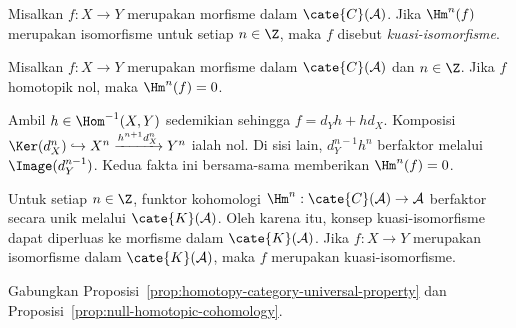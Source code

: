 \begin{definisi}\label{def:quasi-isomorphism}
	Misalkan $f:X\to Y$ merupakan morfisme dalam $\cate{C}(\mathcal{A})$.
	Jika $\Hm^n(f)$ merupakan isomorfisme untuk setiap $n\in\Z$, maka $f$
	disebut \emph{kuasi-isomorfisme}.
\end{definisi}

\begin{proposisi}\label{prop:null-homotopic-cohomology}
	Misalkan $f:X\to Y$ merupakan morfisme dalam $\cate{C}(\mathcal{A})$ dan
	$n\in\Z$. Jika $f$ homotopik nol, maka $\Hm^n(f)=0$.
\end{proposisi}

\begin{bukti}
	Ambil $h\in\Hom^{-1}(X,Y)$ sedemikian sehingga $f=d_Yh+hd_X$.
	Komposisi
	$\Ker(d_X^n)\hookrightarrow X^n\xrightarrow{h^{n+1}d_X^n}Y^n$
	ialah nol. Di sisi lain, $d_Y^{n-1}h^n$ berfaktor melalui
	$\Image(d_Y^{n-1})$. Kedua fakta ini bersama-sama memberikan
	$\Hm^n(f)=0$.
\end{bukti}

\begin{korolari}
	Untuk setiap $n\in\Z$, funktor kohomologi
	$\Hm^n:\cate{C}(\mathcal{A})\to\mathcal{A}$ berfaktor secara unik melalui
	$\cate{K}(\mathcal{A})$. Oleh karena itu, konsep kuasi-isomorfisme dapat
	diperluas ke morfisme dalam $\cate{K}(\mathcal{A})$. Jika $f:X\to Y$
	merupakan isomorfisme dalam $\cate{K}(\mathcal{A})$, maka $f$ merupakan
	kuasi-isomorfisme.
\end{korolari}

\begin{bukti}
	Gabungkan Proposisi~\ref{prop:homotopy-category-universal-property} dan
	Proposisi~\ref{prop:null-homotopic-cohomology}.
\end{bukti}
